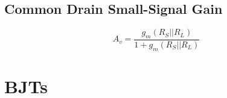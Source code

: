 \subsection{Common Drain Small-Signal Gain}
	\[A_v=\frac{g_m\left(R_S||R_L\right)}{1+g_m\left(R_S||R_L\right)} \]



\section{BJTs}


%
%
%
%
%
